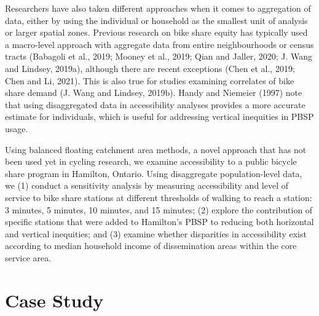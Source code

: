 \documentclass[]{elsarticle} %
\begin{document}
Researchers have also taken different approaches when it comes to
aggregation of data, either by using the individual or household as the
smallest unit of analysis or larger spatial zones. Previous research on
bike share equity has typically used a macro-level approach with
aggregate data from entire neighbourhoods or census tracts (Babagoli et
al., 2019; Mooney et al., 2019; Qian and Jaller, 2020; J. Wang and
Lindsey, 2019a), although there are recent exceptions (Chen et al.,
2019; Chen and Li, 2021). This is also true for studies examining
correlates of bike share demand (J. Wang and Lindsey, 2019b). Handy and
Niemeier (1997) note that using disaggregated data in accessibility
analyses provides a more accurate estimate for individuals, which is
useful for addressing vertical inequities in PBSP usage.

Using balanced floating catchment area methods, a novel approach that
has not been used yet in cycling research, we examine accessibility to a
public bicycle share program in Hamilton, Ontario. Using disaggregate
population-level data, we (1) conduct a sensitivity analysis by
measuring accessibility and level of service to bike share stations at
different thresholds of walking to reach a station: 3 minutes, 5
minutes, 10 minutes, and 15 minutes; (2) explore the contribution of
specific stations that were added to Hamilton's PBSP to reducing both
horizontal and vertical inequities; and (3) examine whether disparities
in accessibility exist according to median household income of
dissemination areas within the core service area.

\hypertarget{sec:study}{%
\section{Case Study}\label{sec:study}}
\end{document}
